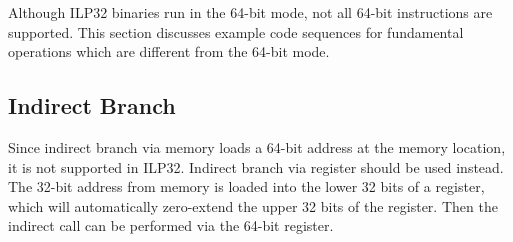 Although ILP32 binaries run in the 64-bit mode, not all 64-bit instructions
are supported. This section discusses example code sequences for
fundamental operations which are different from the 64-bit mode.

\subsection{Indirect Branch}

Since indirect branch via memory loads a 64-bit address at the memory
location, it is not supported in ILP32.  Indirect branch via register
should be used instead.  The 32-bit address from memory is loaded into
the lower 32 bits of a register, which will automatically zero-extend
the upper 32 bits of the register.  Then the indirect call can be
performed via the 64-bit register. 

\begin{table}[H]
\Hrule
\caption{Indirect Branch}
\begin{center}
\end{center}
\Hrule
\end{table}

